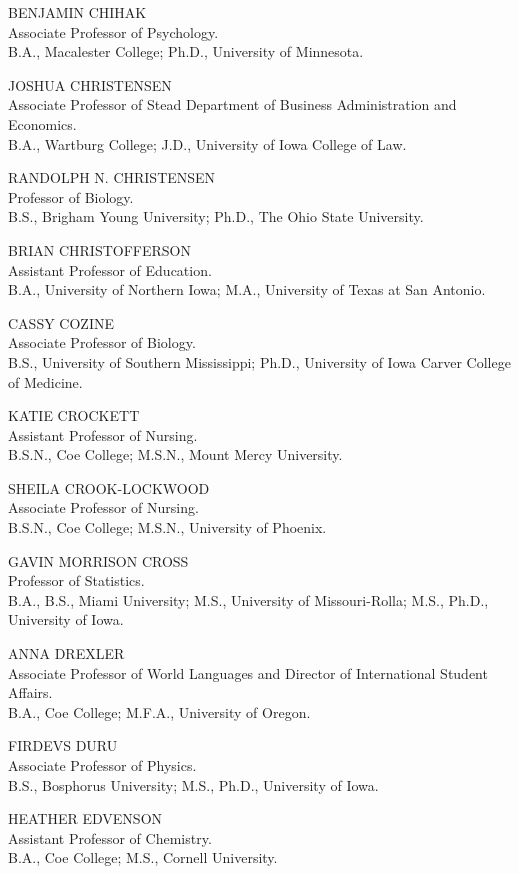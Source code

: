 \documentclass[
  letterpaper,
]{scrbook}
\begin{document}
BENJAMIN CHIHAK\\
Associate Professor of Psychology.\\
B.A., Macalester College; Ph.D., University of Minnesota.

JOSHUA CHRISTENSEN\\
Associate Professor of Stead Department of Business Administration and
Economics.\\
B.A., Wartburg College; J.D., University of Iowa College of Law.

RANDOLPH N. CHRISTENSEN\\
Professor of Biology.\\
B.S., Brigham Young University; Ph.D., The Ohio State University.

BRIAN CHRISTOFFERSON\\
Assistant Professor of Education.\\
B.A., University of Northern Iowa; M.A., University of Texas at San
Antonio.

CASSY COZINE\\
Associate Professor of Biology.\\
B.S., University of Southern Mississippi; Ph.D., University of Iowa
Carver College of Medicine.

KATIE CROCKETT\\
Assistant Professor of Nursing.\\
B.S.N., Coe College; M.S.N., Mount Mercy University.

SHEILA CROOK-LOCKWOOD\\
Associate Professor of Nursing.\\
B.S.N., Coe College; M.S.N., University of Phoenix.

GAVIN MORRISON CROSS\\
Professor of Statistics.\\
B.A., B.S., Miami University; M.S., University of Missouri-Rolla; M.S.,
Ph.D., University of Iowa.

ANNA DREXLER\\
Associate Professor of World Languages and Director of International
Student Affairs.\\
B.A., Coe College; M.F.A., University of Oregon.

FIRDEVS DURU\\
Associate Professor of Physics.\\
B.S., Bosphorus University; M.S., Ph.D., University of Iowa.

HEATHER EDVENSON\\
Assistant Professor of Chemistry.\\
B.A., Coe College; M.S., Cornell University.
\end{document}
